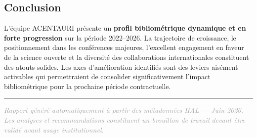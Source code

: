 \documentclass[a4paper,11pt]{article}
\begin{document}
\subsection{Conclusion}

L'équipe ACENTAURI présente un \textbf{profil bibliométrique dynamique et en forte progression} sur la période 2022--2026. La trajectoire de croissance, le positionnement dans les conférences majeures, l'excellent engagement en faveur de la science ouverte et la diversité des collaborations internationales constituent des atouts solides. Les axes d'amélioration identifiés sont des leviers aisément activables qui permettraient de consolider significativement l'impact bibliométrique pour la prochaine période contractuelle.

\vfill
\noindent\rule{\textwidth}{0.4pt}
\begin{center}
\small\textcolor{darkgray}{\textit{Rapport généré automatiquement à partir des métadonnées HAL --- Juin 2026.\\
Les analyses et recommandations constituent un brouillon de travail devant être validé avant usage institutionnel.}}
\end{center}
\end{document}
